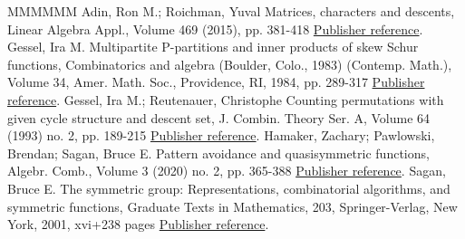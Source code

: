 \documentclass[11pt]{article}
\theoremstyle{definition}
\numberwithin{equation}{section}
\begin{document}
\begin{thebibliography}{MMMMMM}
 Adin, Ron M.; Roichman, Yuval Matrices, characters and descents, Linear Algebra Appl., Volume 469 (2015), pp. 381-418 \href{https://alco.centre-mersenne.org/articles/10.5802/alco.351/#adin_roichman_fine_set}{Publisher reference}.
 Gessel, Ira M. Multipartite P-partitions and inner products of skew Schur functions, Combinatorics and algebra (Boulder, Colo., 1983) (Contemp. Math.), Volume 34, Amer. Math. Soc., Providence, RI, 1984, pp. 289-317 \href{https://alco.centre-mersenne.org/articles/10.5802/alco.351/#knuth_classes_schur_positive}{Publisher reference}.
 Gessel, Ira M.; Reutenauer, Christophe Counting permutations with given cycle structure and descent set, J. Combin. Theory Ser. A, Volume 64 (1993) no. 2, pp. 189-215 \href{https://alco.centre-mersenne.org/articles/10.5802/alco.351/#gessel1993counting}{Publisher reference}.
 Hamaker, Zachary; Pawlowski, Brendan; Sagan, Bruce E. Pattern avoidance and quasisymmetric functions, Algebr. Comb., Volume 3 (2020) no. 2, pp. 365-388 \href{https://alco.centre-mersenne.org/articles/10.5802/alco.351/#S3_patterns_list}{Publisher reference}.
 Sagan, Bruce E. The symmetric group: Representations, combinatorial algorithms, and symmetric functions, Graduate Texts in Mathematics, 203, Springer-Verlag, New York, 2001, xvi+238 pages \href{https://alco.centre-mersenne.org/articles/10.5802/alco.351/#sagan_book}{Publisher reference}.
\end{thebibliography}
\end{document}
